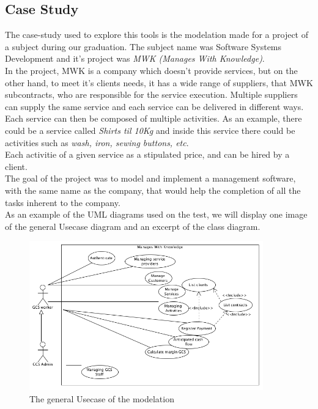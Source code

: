 \subsection*{Case Study}

The case-study used to explore this tools is the modelation made for a project of a subject during our graduation. The subject name was Software Systems Development and it's project was \textit{MWK (Manages With Knowledge)}.\\
In the project, MWK is a company which doesn't provide services, but on the other hand, to meet it's clients needs, it has a wide range of suppliers, that MWK subcontracts, who are responsible for the service execution. Multiple suppliers can supply the same service and each  service can be delivered in different ways. Each service can then be composed of multiple activities. As an example, there could be a service called \textit{Shirts til 10Kg} and inside this service there could be activities such as \textit{wash, iron, sewing buttons, etc}.\\
Each activitie of a given service as a stipulated price, and can be hired by a client.\\
The goal of the project was to model and implement a management software, with the same name as the company, that would help the completion of all the tasks inherent to the company.\\

As an example of the UML diagrams used on the test, we will display one image of the general Usecase diagram and an excerpt of the class diagram.

\begin{figure}[H]
\begin{center}
\includegraphics[width=0.9\textwidth]{images/usecase.png}
\caption{The general Usecase of the modelation}\label{img:usecase}
\end{center}
\end{figure} 

